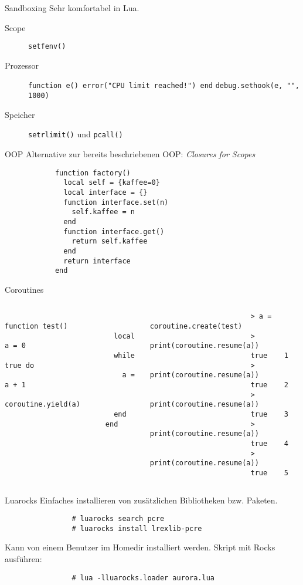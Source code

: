 \documentclass{beamer}
\begin{document}
		\begin{frame}[fragile]{Sandboxing}
			Sehr komfortabel in Lua.

			\begin{description}
				\item[Scope] \verb+setfenv()+
				\item[Prozessor] \verb+function e() error("CPU limit reached!") end+ \verb+debug.sethook(e, "", 1000)+
				\item[Speicher] \verb+setrlimit()+ und \verb+pcall()+
			\end{description}
		\end{frame}
		
		\begin{frame}[fragile]{OOP}
			\lstset{numbers=left}
			Alternative zur bereits beschriebenen OOP: \textit{Closures for Scopes}
			\begin{lstlisting}
			function factory()
			  local self = {kaffee=0}
			  local interface = {}
			  function interface.set(n)
			    self.kaffee = n
			  end
			  function interface.get()
			    return self.kaffee
			  end
			  return interface
			end
			\end{lstlisting}
		\end{frame}

		\begin{frame}[fragile]{Coroutines}
			\begin{columns}
					\begin{lstlisting}
						function test()
						  local a = 0
						  while true do
						    a = a + 1
						    coroutine.yield(a)
						  end
						end
					\end{lstlisting}
					\begin{lstlisting}
						> a = coroutine.create(test)
						> print(coroutine.resume(a))
						true	1
						> print(coroutine.resume(a))
						true	2
						> print(coroutine.resume(a))
						true	3
						> print(coroutine.resume(a))
						true	4
						> print(coroutine.resume(a))
						true	5
					\end{lstlisting}
			\end{columns}
		\end{frame}
		
		\begin{frame}[fragile]{Luarocks}
			\lstset{numbers=none}
			Einfaches installieren von zusätzlichen Bibliotheken bzw. Paketen.
			\begin{lstlisting}
				# luarocks search pcre
				# luarocks install lrexlib-pcre
			\end{lstlisting}
			\vskip15pt
			Kann von einem Benutzer im Homedir installiert werden.
			\vskip15pt
			Skript mit Rocks ausführen:

			\begin{lstlisting}
				# lua -lluarocks.loader aurora.lua
			\end{lstlisting}
		\end{frame}
		
\end{document}
